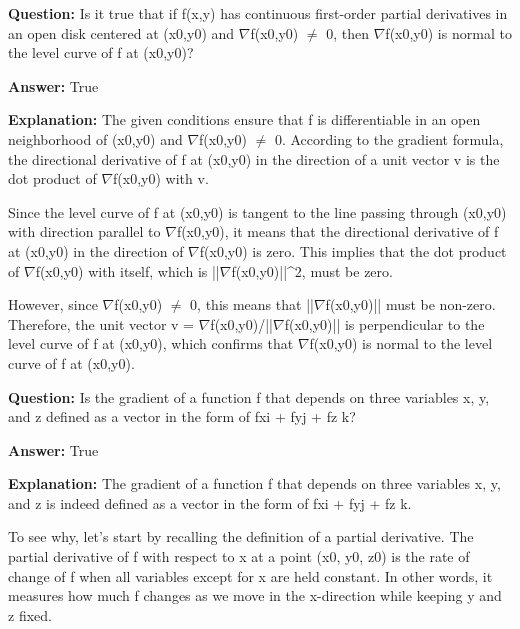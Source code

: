 \documentclass{article}
\begin{document}
            
                \textbf {Question:} Is it true that if f(x,y) has continuous first-order partial derivatives in an open disk centered at (x0,y0) and \ensuremath{\nabla}f(x0,y0) \ensuremath{\neq} 0, then \ensuremath{\nabla}f(x0,y0) is normal to the level curve of f at (x0,y0)?
                
                \textbf{Answer:} True

                \textbf{Explanation:} The given conditions ensure that f is differentiable in an open neighborhood of (x0,y0) and \ensuremath{\nabla}f(x0,y0) \ensuremath{\neq} 0. According to the gradient formula, the directional derivative of f at (x0,y0) in the direction of a unit vector v is the dot product of \ensuremath{\nabla}f(x0,y0) with v.

Since the level curve of f at (x0,y0) is tangent to the line passing through (x0,y0) with direction parallel to \ensuremath{\nabla}f(x0,y0), it means that the directional derivative of f at (x0,y0) in the direction of \ensuremath{\nabla}f(x0,y0) is zero. This implies that the dot product of \ensuremath{\nabla}f(x0,y0) with itself, which is ||\ensuremath{\nabla}f(x0,y0)||{\textasciicircum}2, must be zero.

However, since \ensuremath{\nabla}f(x0,y0) \ensuremath{\neq} 0, this means that ||\ensuremath{\nabla}f(x0,y0)|| must be non-zero. Therefore, the unit vector v = \ensuremath{\nabla}f(x0,y0)/||\ensuremath{\nabla}f(x0,y0)|| is perpendicular to the level curve of f at (x0,y0), which confirms that \ensuremath{\nabla}f(x0,y0) is normal to the level curve of f at (x0,y0).
                
                \vspace{0.5cm} 
        
            
                \textbf {Question:} Is the gradient of a function f that depends on three variables x, y, and z defined as a vector in the form of fxi + fyj + fz k?
                
                \textbf{Answer:} True

                \textbf{Explanation:} The gradient of a function f that depends on three variables x, y, and z is indeed defined as a vector in the form of fxi + fyj + fz k.

To see why, let's start by recalling the definition of a partial derivative. The partial derivative of f with respect to x at a point (x0, y0, z0) is the rate of change of f when all variables except for x are held constant. In other words, it measures how much f changes as we move in the x-direction while keeping y and z fixed.
\end{document}
